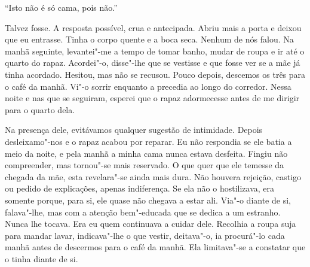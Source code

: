 ``Isto não é só cama, pois não.''

Talvez fosse. A resposta possível, crua e antecipada. Abriu mais a porta
e deixou que eu entrasse. Tinha o corpo quente e a boca seca. Nenhum de
nós falou. Na manhã seguinte, levantei"-me a tempo de tomar banho, mudar
de roupa e ir até o quarto do rapaz. Acordei"-o, disse"-lhe que se
vestisse e que fosse ver se a mãe já tinha acordado. Hesitou, mas não se
recusou. Pouco depois, descemos os três para o café da manhã. Vi"-o
sorrir enquanto a precedia ao longo do corredor. Nessa noite e nas que
se seguiram, esperei que o rapaz adormecesse antes de me dirigir para o
quarto dela.

Na presença dele, evitávamos qualquer sugestão de intimidade. Depois
desleixamo"-nos e o rapaz acabou por reparar. Eu não respondia se ele
batia a meio da noite, e pela manhã a minha cama nunca estava desfeita.
Fingiu não compreender, mas tornou"-se mais reservado. O que quer que
ele temesse da chegada da mãe, esta revelara"-se ainda mais dura. Não
houvera rejeição, castigo ou pedido de explicações, apenas indiferença.
Se ela não o hostilizava, era somente porque, para si, ele quase não
chegava a estar ali. Via"-o diante de si, falava"-lhe, mas com a atenção
bem"-educada que se dedica a um estranho. Nunca lhe tocava. Era eu quem
continuava a cuidar dele. Recolhia a roupa suja para mandar lavar,
indicava"-lhe o que vestir, deitava"-o, ia procurá"-lo cada manhã antes
de descermos para o café da manhã. Ela limitava"-se a constatar que o
tinha diante de si.

